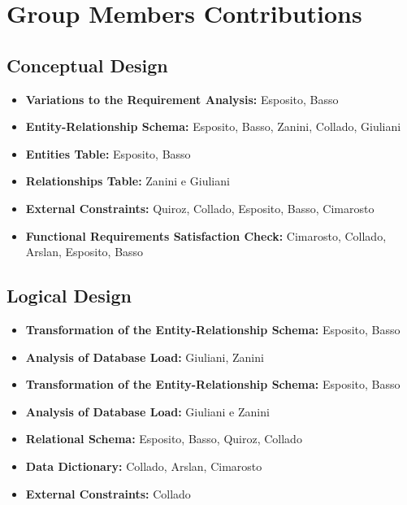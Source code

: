 \section{Group Members Contributions}


\subsection{Conceptual Design}
\begin{itemize}
	\item \textbf{Variations to the Requirement Analysis:} Esposito, Basso
	\item \textbf{Entity-Relationship Schema:} Esposito, Basso, Zanini, Collado, Giuliani 
	\item \textbf{Entities Table:} Esposito, Basso
	\item \textbf{Relationships Table:} Zanini e Giuliani
	\item \textbf{External Constraints:} Quiroz, Collado, Esposito, Basso, Cimarosto
	\item \textbf{Functional Requirements Satisfaction Check:} Cimarosto, Collado, Arslan, Esposito, Basso
\end{itemize}

\subsection{Logical Design}
\begin{itemize}
	\item \textbf{Transformation of the Entity-Relationship Schema:} Esposito, Basso 
	\item \textbf{Analysis of Database Load:} Giuliani, Zanini
	\item \textbf{Transformation of the Entity-Relationship Schema:} Esposito, Basso
	\item \textbf{Analysis of Database Load:} Giuliani e Zanini
	\item \textbf{Relational Schema:} Esposito, Basso, Quiroz, Collado
	\item \textbf{Data Dictionary:} Collado, Arslan, Cimarosto
	\item \textbf{External Constraints:} Collado
\end{itemize}	